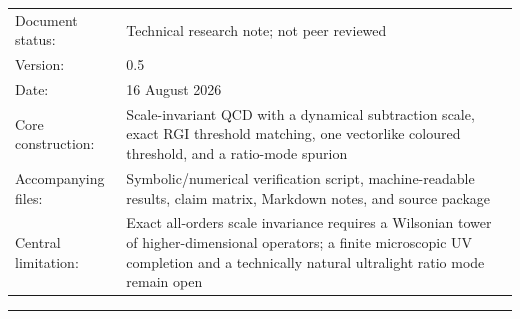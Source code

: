 \documentclass[11pt,a4paper]{article}
\begin{document}
\begin{titlepage}
\begin{tabularx}{\textwidth}{@{}p{}X@{}}
Document status: & Technical research note; not peer reviewed \\
Version: & 0.5 \\
Date: & 16 August 2026 \\
Core construction: & Scale-invariant QCD with a dynamical subtraction scale, exact RGI threshold matching, one vectorlike coloured threshold, and a ratio-mode spurion \\
Accompanying files: & Symbolic/numerical verification script, machine-readable results, claim matrix, Markdown notes, and source package \\
Central limitation: & Exact all-orders scale invariance requires a Wilsonian tower of higher-dimensional operators; a finite microscopic UV completion and a technically natural ultralight ratio mode remain open
\end{tabularx}

\vspace{7mm}
{\color{navy}\rule{\textwidth}{1.2pt}}
\end{titlepage}

\end{document}
